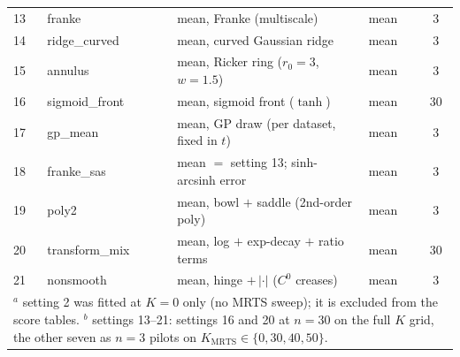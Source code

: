 \documentclass[11pt]{article}
\newcommand{\Kmrts}{K_{\mathrm{MRTS}}}
\begin{document}
\begin{table}[ht]
\begin{tabular}{llllc}
13 & franke         & mean, Franke (multiscale)                 & mean & 3 \\
14 & ridge\_curved  & mean, curved Gaussian ridge               & mean & 3 \\
15 & annulus        & mean, Ricker ring ($r_0{=}3$, $w{=}1.5$)   & mean & 3 \\
16 & sigmoid\_front & mean, sigmoid front ($\tanh$)             & mean & 30 \\
17 & gp\_mean       & mean, GP draw (per dataset, fixed in $t$)  & mean & 3 \\
18 & franke\_sas    & mean $=$ setting 13; sinh-arcsinh error   & mean & 3 \\
19 & poly2          & mean, bowl $+$ saddle (2nd-order poly)     & mean & 3 \\
20 & transform\_mix & mean, log $+$ exp-decay $+$ ratio terms    & mean & 30 \\
21 & nonsmooth      & mean, hinge $+\,|\cdot|$ ($C^0$ creases)   & mean & 3 \\
\bottomrule
\multicolumn{5}{p{0.92\textwidth}}{\footnotesize $^{a}$ setting 2 was fitted at $K=0$ only (no MRTS sweep); it is excluded from the score tables. $^{b}$ settings 13--21: settings 16 and 20 at $n=30$ on the full $K$ grid, the other seven as $n=3$ pilots on $\Kmrts \in \{0,30,40,50\}$.}
\end{tabular}
\end{table}
\end{document}
